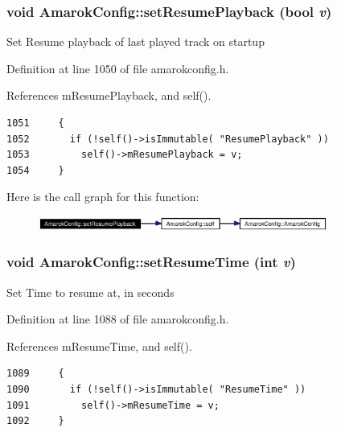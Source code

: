 \subsubsection{\setlength{\rightskip}{0pt plus 5cm}void Amarok\-Config::set\-Resume\-Playback (bool {\em v})\hspace{0.3cm}{\tt  [inline, static]}}\label{classAmarokConfig_AmarokConfige109}


Set Resume playback of last played track on startup 

Definition at line 1050 of file amarokconfig.h.

References m\-Resume\-Playback, and self().



\footnotesize\begin{verbatim}1051     {
1052       if (!self()->isImmutable( "ResumePlayback" ))
1053         self()->mResumePlayback = v;
1054     }
\end{verbatim}\normalsize 


Here is the call graph for this function:\begin{figure}[H]
\begin{center}
\leavevmode
\includegraphics[width=269pt]{classAmarokConfig_AmarokConfige109_cgraph}
\end{center}
\end{figure}
\subsubsection{\setlength{\rightskip}{0pt plus 5cm}void Amarok\-Config::set\-Resume\-Time (int {\em v})\hspace{0.3cm}{\tt  [inline, static]}}\label{classAmarokConfig_AmarokConfige113}


Set Time to resume at, in seconds 

Definition at line 1088 of file amarokconfig.h.

References m\-Resume\-Time, and self().



\footnotesize\begin{verbatim}1089     {
1090       if (!self()->isImmutable( "ResumeTime" ))
1091         self()->mResumeTime = v;
1092     }
\end{verbatim}\normalsize 


